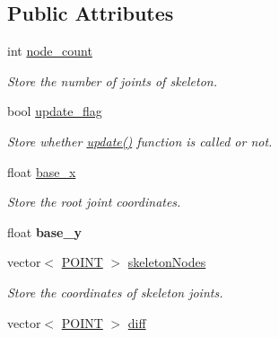 \subsection*{\-Public \-Attributes}
\begin{DoxyCompactItemize}
\item 
\hypertarget{classDrawnSkeleton_ae971e61b960b25a06e9a086ab30d4164}{int \hyperlink{classDrawnSkeleton_ae971e61b960b25a06e9a086ab30d4164}{node\-\_\-count}}\label{classDrawnSkeleton_ae971e61b960b25a06e9a086ab30d4164}

\begin{DoxyCompactList}\small\item\em \-Store the number of joints of skeleton. \end{DoxyCompactList}\item 
\hypertarget{classDrawnSkeleton_a06ead449a985f64a8e30e748bd501b06}{bool \hyperlink{classDrawnSkeleton_a06ead449a985f64a8e30e748bd501b06}{update\-\_\-flag}}\label{classDrawnSkeleton_a06ead449a985f64a8e30e748bd501b06}

\begin{DoxyCompactList}\small\item\em \-Store whether \hyperlink{classDrawnSkeleton_ad38f1661673431a72236c882c01e1011}{update()} function is called or not. \end{DoxyCompactList}\item 
\hypertarget{classDrawnSkeleton_a381328c50a2d345fb5815572ffb04ea9}{float \hyperlink{classDrawnSkeleton_a381328c50a2d345fb5815572ffb04ea9}{base\-\_\-x}}\label{classDrawnSkeleton_a381328c50a2d345fb5815572ffb04ea9}

\begin{DoxyCompactList}\small\item\em \-Store the root joint coordinates. \end{DoxyCompactList}\item 
\hypertarget{classDrawnSkeleton_a59389e3ca0ed18f268ab2ed9f3c94dbb}{float {\bfseries base\-\_\-y}}\label{classDrawnSkeleton_a59389e3ca0ed18f268ab2ed9f3c94dbb}

\item 
\hypertarget{classDrawnSkeleton_a1d9c8842f31312c2d83ad327949ef2d7}{vector$<$ \hyperlink{structPOINT}{\-P\-O\-I\-N\-T} $>$ \hyperlink{classDrawnSkeleton_a1d9c8842f31312c2d83ad327949ef2d7}{skeleton\-Nodes}}\label{classDrawnSkeleton_a1d9c8842f31312c2d83ad327949ef2d7}

\begin{DoxyCompactList}\small\item\em \-Store the coordinates of skeleton joints. \end{DoxyCompactList}\item 
\hypertarget{classDrawnSkeleton_aecfe65d1b552f2b7fb2ececada22a743}{vector$<$ \hyperlink{structPOINT}{\-P\-O\-I\-N\-T} $>$ \hyperlink{classDrawnSkeleton_aecfe65d1b552f2b7fb2ececada22a743}{diff}}\label{classDrawnSkeleton_aecfe65d1b552f2b7fb2ececada22a743}


\end{DoxyCompactItemize}
